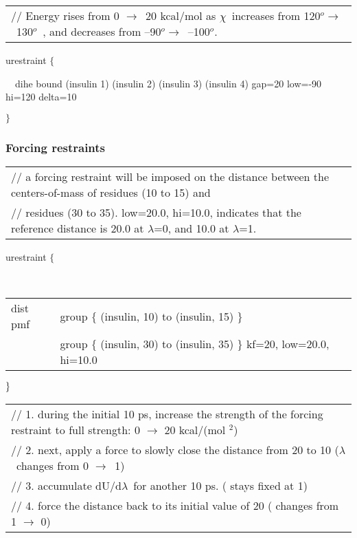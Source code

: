 \begin{tabular}{l}
{\footnotesize // Energy rises from 0 }$\rightarrow ${\footnotesize \ 20
kcal/mol as }$\chi ${\footnotesize \ {}increases from 120}$^{o}\rightarrow $%
{\footnotesize \ 130}$^{o}${\footnotesize \ , and decreases from --90}$%
^{o}\rightarrow ${\footnotesize \ --100}$^{o}${\footnotesize .}
\end{tabular}

urestraint $\{$

~~dihe bound (insulin 1) (insulin 2) (insulin 3) (insulin 4) gap=20 low=-90
hi=120 delta=10

$\}$

\subsubsection{Forcing restraints}

\begin{tabular}{l}
{\footnotesize // a forcing restraint will be imposed on the distance
between the centers-of-mass of residues (10 to 15) and} \\ 
{\footnotesize // residues (30 to 35). low=20.0, hi=10.0, indicates that the
reference distance is 20.0%
at }$\lambda ${\footnotesize =0, and 10.0%
at }$\lambda ${\footnotesize =1.}
\end{tabular}

urestraint $\{$

~~
\begin{tabular}{ll}
dist pmf & group $\{$ (insulin, 10) to (insulin, 15) $\}$ \\ 
& \hspace{0pt}group $\{$ (insulin, 30) to (insulin, 35) $\}$ kf=20,
low=20.0, hi=10.0
\end{tabular}

$\}\medskip $

\begin{tabular}{l}
{\footnotesize // 1. during the initial 10 ps, increase the strength of the
forcing restraint to full strength: 0 }$\rightarrow $ {\footnotesize 20
kcal/(mol %
}$^{2}${\footnotesize )} \\ 
{\footnotesize // 2. next, apply a force to slowly close the distance from
20 %
to 10 %
(}$\lambda ${\footnotesize \ changes from 0 }$\rightarrow ${\footnotesize \
1)} \\ 
{\footnotesize // 3. accumulate dU/d}$\lambda ${\footnotesize \ for another
10 ps. ( stays fixed at 1)} \\ 
{\footnotesize // 4. force the distance back to its initial value of 20 
( changes from 1 }$\rightarrow $ {\footnotesize 0)}
\end{tabular}


